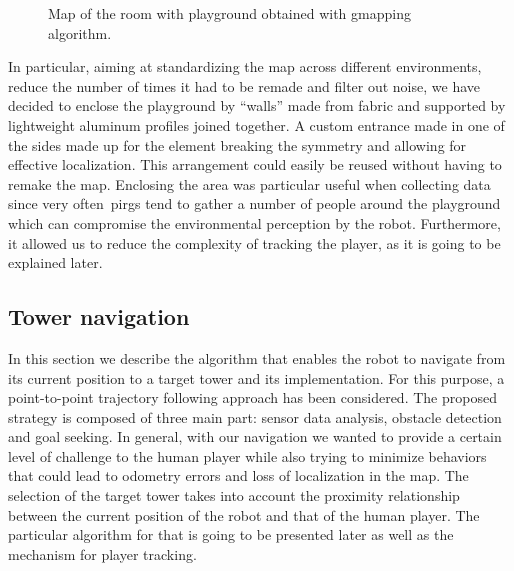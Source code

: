\begin{figure}[h]
	\centering
	\caption{Map of the room with playground obtained with gmapping algorithm.} 
	\label{fig:playground_map}
\end{figure}

In particular, aiming at standardizing the map across different environments, reduce the number of times it had to be remade and filter out noise, we have decided to enclose the playground by ``walls'' made from fabric and supported by lightweight aluminum profiles joined together. A custom entrance made in one of the sides made up for the element breaking the symmetry and allowing for effective localization. This arrangement could easily be reused without having to remake the map. Enclosing the area was particular useful when collecting data since very often~\gls{pirg}s tend to gather a number of people around the playground which can compromise the environmental perception by the robot. Furthermore, it allowed us to reduce the complexity of tracking the player, as it is going to be explained later. 

\subsection{Tower navigation}
In this section we describe the algorithm that enables the robot to navigate from its current position to a target tower and its implementation. For this purpose, a point-to-point trajectory following approach has been considered. The proposed strategy is composed of three main part: sensor data analysis, obstacle detection and goal seeking. In general, with our navigation we wanted to provide a certain level of challenge to the human player while also trying to minimize behaviors that could lead to odometry errors and loss of localization in the map. The selection of the target tower takes into account the proximity relationship between the current position of the robot and that of the human player. The particular algorithm for that is going to be presented later as well as the mechanism for player tracking.

